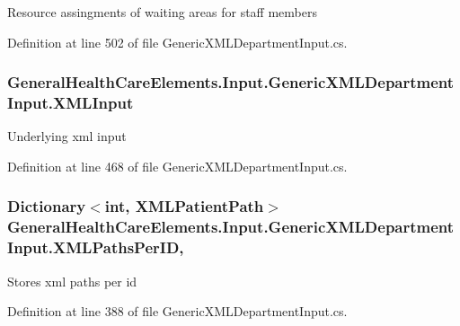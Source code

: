Resource assingments of waiting areas for staff members 



Definition at line 502 of file Generic\+X\+M\+L\+Department\+Input.\+cs.

\subsubsection[{\texorpdfstring{X\+M\+L\+Input}{XMLInput}}]{ General\+Health\+Care\+Elements.\+Input.\+Generic\+X\+M\+L\+Department\+Input.\+X\+M\+L\+Input\hspace{0.3cm}{\ttfamily [get]}}\hypertarget{class_general_health_care_elements_1_1_input_1_1_generic_x_m_l_department_input_ab0d2f9b0384a6128a87b418c0e6de8d7}{}\label{class_general_health_care_elements_1_1_input_1_1_generic_x_m_l_department_input_ab0d2f9b0384a6128a87b418c0e6de8d7}


Underlying xml input 



Definition at line 468 of file Generic\+X\+M\+L\+Department\+Input.\+cs.

\subsubsection[{\texorpdfstring{X\+M\+L\+Paths\+Per\+ID}{XMLPathsPerID}}]{\setlength{\rightskip}{0pt plus 5cm}Dictionary$<$int, {\bf X\+M\+L\+Patient\+Path}$>$ General\+Health\+Care\+Elements.\+Input.\+Generic\+X\+M\+L\+Department\+Input.\+X\+M\+L\+Paths\+Per\+ID\hspace{0.3cm}{\ttfamily [get]}, {\ttfamily [set]}}\hypertarget{class_general_health_care_elements_1_1_input_1_1_generic_x_m_l_department_input_ab0c59c69dbed5eceb3fcf187cd92549a}{}\label{class_general_health_care_elements_1_1_input_1_1_generic_x_m_l_department_input_ab0c59c69dbed5eceb3fcf187cd92549a}


Stores xml paths per id 



Definition at line 388 of file Generic\+X\+M\+L\+Department\+Input.\+cs.

